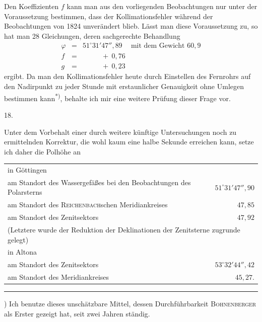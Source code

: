 Den Koeffizienten $f$ kann man aus den vorliegenden Beobachtungen nur unter der Voraussetzung bestimmen, dass der Kollimationsfehler während der Beobachtungen von 1824 unverändert blieb. Lässt man diese Voraussetzung zu, so hat man 28 Gleichungen, deren sachgerechte Behandlung
\[
\begin{array}{rcll}
\varphi&=&51^\circ31'47''{,}89&\text{mit dem Gewicht }60{,}9\\
f&=&\phantom{51^\circ31'}+\ 0{,}76&\\
g&=&\phantom{51^\circ31'}+\ 0{,}23&
\end{array}
\]
ergibt. Da man den Kollimationsfehler heute durch Einstellen des Fernrohrs auf den Nadirpunkt zu jeder Stunde mit erstaunlicher Genauigkeit ohne Umlegen bestimmen kann\textsuperscript{*)}, behalte ich mir eine weitere Prüfung dieser Frage vor.
\begin{center}18.\end{center}
Unter dem Vorbehalt einer durch weitere künftige Untersuchungen noch zu ermittelnden Korrektur, die wohl kaum eine halbe Sekunde erreichen kann, setze ich daher die Polhöhe an
\begin{center}
\begin{tabular}{p{}r}
in Göttingen&\\
\quad am Standort des Wassergefäßes bei den Beobachtungen des Polarsterns&$51^\circ31'47''{,}90$\\
\quad am Standort des \textsc{Reichenbach}schen Meridiankreises&$47{,}85$\\
\quad am Standort des Zenitsektors&$47{,}92$\\
\multicolumn{2}{p{.94\textwidth}}{\quad\quad (Letztere wurde der Reduktion der Deklinationen der Zenitsterne zugrunde gelegt)}\\
in Altona&\\
\quad am Standort des Zenitsektors&$53^\circ32'44''{,}42$\\
\quad am Standort des Meridiankreises&$45{,}27$.
\end{tabular}
\end{center}
\par\noindent\rule{.25\textwidth}{.4pt}\par
{\footnotesize *) Ich benutze dieses unschätzbare Mittel, dessen Durchführbarkeit \textsc{Bohnenberger} als Erster gezeigt hat, seit zwei Jahren ständig.\par}

